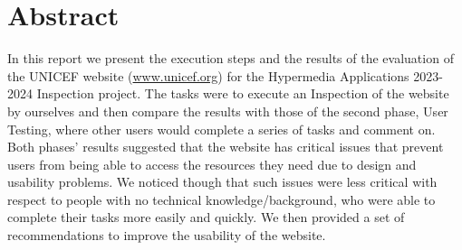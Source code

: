 \section{Abstract}
In this report we present the execution steps and the results of the evaluation of the UNICEF website (\url{www.unicef.org}) for the Hypermedia Applications 2023-2024 Inspection project. The tasks were to execute an Inspection of the website by ourselves and then compare the results with those of the second phase, User Testing, where other users would complete a series of tasks and comment on. Both phases' results suggested that the website has critical issues that prevent users from being able to access the resources they need due to design and usability problems. We noticed though that such issues were less critical with respect to people with no technical knowledge/background, who were able to complete their tasks more easily and quickly. We then provided a set of recommendations to improve the usability of the website.
